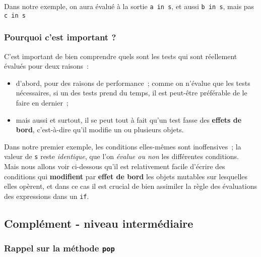     Dans notre exemple, on aura évalué à la sortie
\texttt{\textquotesingle{}a\textquotesingle{}\ in\ s}, et aussi
\texttt{\textquotesingle{}b\textquotesingle{}\ in\ s}, mais pas
\texttt{\textquotesingle{}c\textquotesingle{}\ in\ s}

    \hypertarget{pourquoi-cest-important}{%
\subsubsection{Pourquoi c'est important
?}\label{pourquoi-cest-important}}

    C'est important de bien comprendre quels sont les tests qui sont
réellement évalués pour deux raisons~:

\begin{itemize}
\tightlist
\item
  d'abord, pour des raisons de performance~; comme on n'évalue que les
  tests nécessaires, si un des tests prend du temps, il est peut-être
  préférable de le faire en dernier~;
\item
  mais aussi et surtout, il se peut tout à fait qu'un test fasse des
  \textbf{effets de bord}, c'est-à-dire qu'il modifie un ou plusieurs
  objets.
\end{itemize}

    Dans notre premier exemple, les conditions elles-mêmes sont
inoffensives~; la valeur de \texttt{s} reste \emph{identique}, que l'on
\emph{évalue ou non} les différentes conditions.\\

Mais nous allons voir ci-dessous qu'il est relativement facile d'écrire
des conditions qui \textbf{modifient} par \textbf{effet de bord} les
objets mutables sur lesquelles elles opèrent, et dans ce cas il est
crucial de bien assimiler la règle des évaluations des expressions dans
un \texttt{if}.

    \hypertarget{compluxe9ment---niveau-intermuxe9diaire}{%
\subsection{Complément - niveau
intermédiaire}\label{compluxe9ment---niveau-intermuxe9diaire}}

    \hypertarget{rappel-sur-la-muxe9thode-pop}{%
\subsubsection{\texorpdfstring{Rappel sur la méthode
\texttt{pop}}{Rappel sur la méthode pop}}\label{rappel-sur-la-muxe9thode-pop}}

